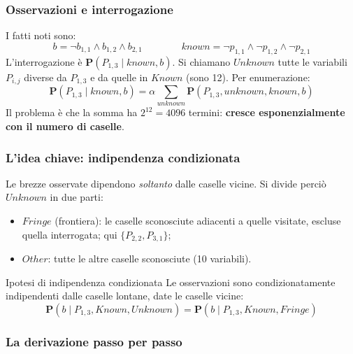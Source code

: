 \documentclass[11pt, a4paper]{article}
\renewcommand{\emph}[1]{\textcolor{verdechiaro}{\itshape #1}}
\newcommand{\Pv}{\mathbf{P}}               %
\newcommand{\known}{\mathit{known}}
\newcommand{\unknown}{\mathit{unknown}}
\begin{document}
\subsubsection*{Osservazioni e interrogazione}

I fatti noti sono:
\[
  b = \lnot b_{1,1} \land b_{1,2} \land b_{2,1}
  \qquad\qquad
  \known = \lnot p_{1,1} \land \lnot p_{1,2} \land \lnot p_{2,1}
\]
L'interrogazione è $\Pv(P_{1,3} \mid \known, b)$. Si chiamano $\mathit{Unknown}$ tutte le variabili $P_{i,j}$ diverse da $P_{1,3}$ e da quelle in $\mathit{Known}$ (sono 12). Per enumerazione:
\[
  \Pv(P_{1,3} \mid \known, b) = \alpha \sum_{\unknown} \Pv(P_{1,3}, \unknown, \known, b)
\]
Il problema è che la somma ha $2^{12} = 4096$ termini: \textbf{cresce esponenzialmente con il numero di caselle}.

\subsubsection*{L'idea chiave: indipendenza condizionata}

Le brezze osservate dipendono \emph{soltanto} dalle caselle vicine. Si divide perciò $\mathit{Unknown}$ in due parti:
\begin{itemize}
  \item $\mathit{Fringe}$ (frontiera): le caselle sconosciute adiacenti a quelle visitate, escluse quella interrogata; qui $\{P_{2,2}, P_{3,1}\}$;
  \item $\mathit{Other}$: tutte le altre caselle sconosciute (10 variabili).
\end{itemize}

\begin{chiave}{Ipotesi di indipendenza condizionata}
  Le osservazioni sono condizionatamente indipendenti dalle caselle lontane, date le caselle vicine:
  \[
    \Pv(b \mid P_{1,3}, \mathit{Known}, \mathit{Unknown}) = \Pv(b \mid P_{1,3}, \mathit{Known}, \mathit{Fringe})
  \]
\end{chiave}

\subsubsection*{La derivazione passo per passo}
\end{document}
